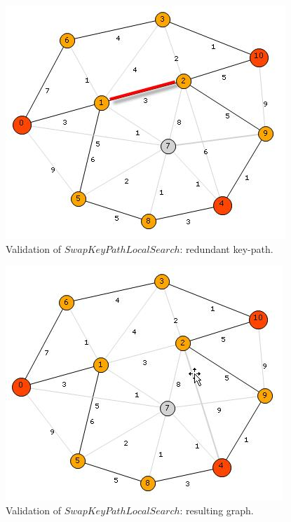 \begin{figure}[H]
\begin{center}
\includegraphics[scale=0.9]{34.jpg}
\caption{Validation of $SwapKeyPathLocalSearch$: redundant key-path.}\label{fig:34}
\end{center} 
\end{figure}

\begin{figure}[H]
\begin{center}
\includegraphics[scale=0.9]{35.jpg}
\caption{Validation of $SwapKeyPathLocalSearch$: resulting graph.}\label{fig:35}
\end{center} 
\end{figure}

